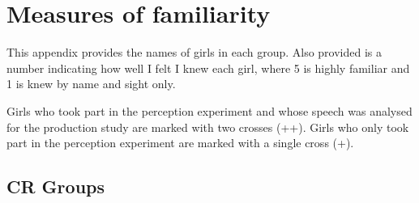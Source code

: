 %


%
\chapter{Measures of familiarity}\label{app:socialgroups}
\noindent This appendix provides the names of girls in each group.  Also provided is a number indicating how well I felt I knew each girl, where 5 is highly familiar and 1 is knew by name and sight only. 

Girls who took part in the perception experiment and whose speech was analysed for the production study are marked with two crosses (++).  Girls who only took part in the perception experiment are marked with a single cross (+).


\section{CR Groups}

